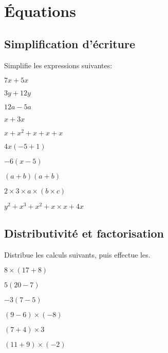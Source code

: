 \section{Équations}

\subsection*{Simplification d'écriture}

\begin{exercice}
    Simplifie les expressions suivantes:
    \begin{exerciceenum}
        \item $7x+5x$
        \item $3y+12y$
        \item $12a-5a$
        \item $x+3x$
        \item $x+x^2+x+x+x$
        \item $4x(-5 + 1)$
        \item $-6(x - 5)$
        \item $(a+b)(a+b)$
        \item $2\times 3 \times a\times (b\times c)$
        \item $y^2 + x^3 + x^2 + x\times x + 4x$
    \end{exerciceenum}
\end{exercice}

\subsection*{Distributivité et factorisation}

\begin{exercice}
    Distribue les calculs suivants, puis effectue les.
    \begin{exerciceenum}
        \item $8\times (17 + 8)$
        \item $5(20 - 7)$
        \item $-3(7-5)$
        \item $(9 - 6) \times (-8)$
        \item $(7 + 4) \times 3$
        \item $(11 + 9) \times (-2)$
    \end{exerciceenum}
\end{exercice}

